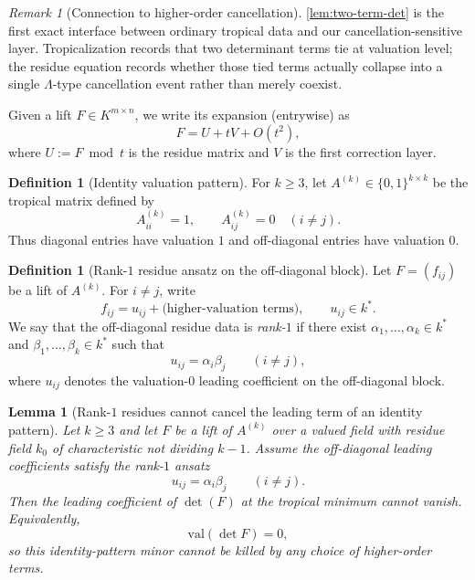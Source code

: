 \documentclass[11pt]{amsart}
\numberwithin{equation}{section}
\theoremstyle{plain}
\newtheorem{lemma}[theorem]{Lemma}
\theoremstyle{definition}
\newtheorem{definition}[theorem]{Definition}
\theoremstyle{remark}
\newtheorem{remark}[theorem]{Remark}
\newcommand{\val}{\mathrm{val}}
\newcommand{\Lam}{\Lambda}
\begin{document}
\begin{remark}[Connection to higher-order cancellation]
\cref{lem:two-term-det} is the first exact interface between ordinary tropical data and our cancellation-sensitive layer. Tropicalization
records that two determinant terms tie at valuation level; the residue equation records whether those tied terms actually collapse into a
single $\Lam$-type cancellation event rather than merely coexist.
\end{remark}

Given a lift $F\in K^{m\times n}$, we write its expansion (entrywise) as
\[
F = U + t V + O(t^2),
\]
where $U:=F \bmod t$ is the residue matrix and $V$ is the first correction layer.

\begin{definition}[Identity valuation pattern]
\label{def:identity-valuation-pattern}
For $k\ge 3$, let $A^{(k)}\in\{0,1\}^{k\times k}$ be the tropical matrix defined by
\[
A^{(k)}_{ii}=1,
\qquad
A^{(k)}_{ij}=0\quad (i\neq j).
\]
Thus diagonal entries have valuation $1$ and off-diagonal entries have valuation $0$.
\end{definition}

\begin{definition}[Rank-$1$ residue ansatz on the off-diagonal block]
\label{def:rank1-residue-ansatz}
Let $F=(f_{ij})$ be a lift of $A^{(k)}$. For $i\neq j$, write
\[
f_{ij}=u_{ij}+\text{(higher-valuation terms)},
\qquad u_{ij}\in k^*.
\]
We say that the off-diagonal residue data is \emph{rank-$1$} if there exist
$\alpha_1,\dots,\alpha_k\in k^*$ and $\beta_1,\dots,\beta_k\in k^*$ such that
\[u_{ij}=\alpha_i\beta_j
\qquad (i\neq j),
\]
where $u_{ij}$ denotes the valuation-$0$ leading coefficient on the off-diagonal block.
\end{definition}

\begin{lemma}[Rank-$1$ residues cannot cancel the leading term of an identity pattern]
\label{lem:rank1-residues-identity-obstruction}
Let $k\ge 3$ and let $F$ be a lift of $A^{(k)}$ over a valued field with residue field $k_0$ of characteristic not dividing $k-1$.
Assume the off-diagonal leading coefficients satisfy the rank-$1$ ansatz
\[u_{ij}=\alpha_i\beta_j\qquad (i\neq j).
\]
Then the leading coefficient of $\det(F)$ at the tropical minimum cannot vanish. Equivalently,
\[
\val(\det F)=0,
\]
so this identity-pattern minor cannot be killed by any choice of higher-order terms.
\end{lemma}
\end{document}
